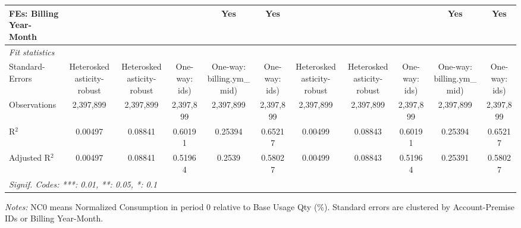 \begin{table}[htbp]
\begin{tabular}{lcccccccccc}
FEs: Billing Year-Month &  &  &  & Yes & Yes &  &  &  & Yes & Yes\\
\midrule
\emph{Fit statistics}&  & & & & & & & & & \\
Standard-Errors& Heteroskedasticity-robust&Heteroskedasticity-robust&One-way: ids)&One-way: billing.ym\_mid)&One-way: ids)&Heteroskedasticity-robust&Heteroskedasticity-robust&One-way: ids)&One-way: billing.ym\_mid)&One-way: ids)\\
Observations & 2,397,899&2,397,899&2,397,899&2,397,899&2,397,899&2,397,899&2,397,899&2,397,899&2,397,899&2,397,899\\
R$^2$ & 0.00497&0.08841&0.60191&0.25394&0.65217&0.00499&0.08843&0.60191&0.25394&0.65217\\
Adjusted R$^2$ & 0.00497&0.08841&0.51964&0.2539&0.58027&0.00499&0.08843&0.51964&0.25391&0.58027\\
\bottomrule\bottomrule
\multicolumn{11}{l}{\emph{Signif. Codes: ***: 0.01, **: 0.05, *: 0.1}}\\
\end{tabular}

\emph{\medskip Notes:} NC0 means Normalized Consumption in period 0 relative to Base Usage Qty (\%). Standard errors are clustered by Account-Premise IDs or Billing Year-Month.
\end{table}